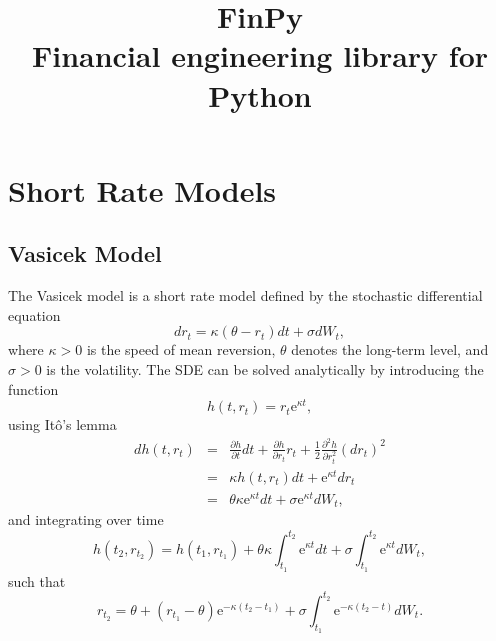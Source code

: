 \documentclass{report}
\title{FinPy \\[0.4cm] \Large Financial engineering library for Python}
\begin{document}
\maketitle

\tableofcontents



\appendix

\chapter{Short Rate Models}

\section{Vasicek Model}
The Vasicek model \cite{Vasicek1977} is a short rate model defined by the stochastic differential equation 
\begin{equation}
dr_t = \kappa \left( \theta - r_t \right) dt + \sigma dW_t,
\end{equation}
where $\kappa > 0$ is the speed of mean reversion, $\theta$ denotes the long-term level, and $\sigma > 0$ is the volatility.
The SDE can be solved analytically by introducing the function
\begin{equation}
h(t, r_t) = r_t \text{e}^{\kappa t},
\end{equation}
using It\^{o}'s lemma
\begin{eqnarray}
dh(t, r_t) &=& \frac{\partial h}{\partial t} dt + \frac{\partial h}{\partial r_t} r_t + \frac{1}{2}\frac{\partial^2 h}{\partial r_t^2} \left(dr_t\right)^2 \\
&=& \kappa h(t, r_t) dt + \text{e}^{\kappa t} dr_t \\
&=& \theta \kappa \text{e}^{\kappa t} dt + \sigma \text{e}^{\kappa t} dW_t,
\end{eqnarray}
and integrating over time
\begin{equation}
h(t_2, r_{t_2}) = h(t_1, r_{t_1}) + \theta \kappa \int_{t_1}^{t_2} \text{e}^{\kappa t} dt + \sigma \int_{t_1}^{t_2} \text{e}^{\kappa t} dW_t,
\end{equation}
such that
\begin{equation}
r_{t_2} = \theta + \left( r_{t_1} - \theta \right) \text{e}^{-\kappa (t_2 - t_1)} + \sigma \int_{t_1}^{t_2} \text{e}^{-\kappa \left(t_2 - t\right)} dW_t.
\end{equation}
\end{document}
